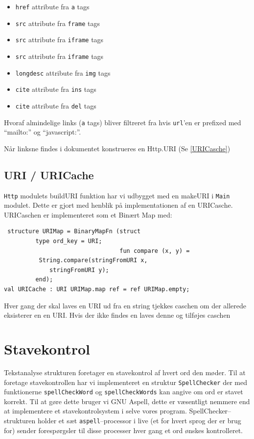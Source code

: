 \documentclass[a4paper,oneside,article]{memoir}
\begin{document}
\begin{itemize}
 \item \texttt{href} attribute fra \texttt{a} tags
 \item \texttt{src} attribute fra \texttt{frame} tags
 \item \texttt{src} attribute fra \texttt{iframe} tags
 \item \texttt{src} attribute fra \texttt{iframe} tags
 \item \texttt{longdesc} attribute fra \texttt{img} tags
 \item \texttt{cite} attribute fra \texttt{ins} tags
 \item \texttt{cite} attribute fra \texttt{del} tags
\end{itemize}

Hvoraf almindelige links (\texttt{a} tags) bliver filtreret fra hvis
\texttt{url}'en er prefixed med ``mailto:'' og ``javascript:''.

 Når linksne findes i dokumentet konstrueres en Http.URI (Se \ref{URICasche})

\subsection{URI / URICache}

\texttt{Http} modulets buildURI funktion har vi udbygget med en
makeURI i \texttt{Main} modulet. Dette er gjort med henblik på
implementationen af en URICasche. URICaschen er implementeret som et
Binært Map med:

\begin{lstlisting}
 structure URIMap = BinaryMapFn (struct 
         type ord_key = URI; 
                                 fun compare (x, y) = 
          String.compare(stringFromURI x, 
             stringFromURI y);
         end);
val URICache : URI URIMap.map ref = ref URIMap.empty;
\end{lstlisting}

Hver gang der skal laves en URI ud fra en string tjekkes caschen om
der allerede eksisterer en en URI. Hvis der ikke findes en laves denne
og tilføjes caschen

\section{Stavekontrol}
\label{Spellchecker}

Tekstanalyse strukturen foretager en stavekontrol af hvert ord den
møder. Til at foretage stavekontrollen har vi implementeret en
struktur \texttt{SpellChecker} der med funktionerne
\texttt{spellCheckWord} og \texttt{spellCheckWords} kan angive om ord
er stavet korrekt. Til at gøre dette bruger vi GNU Aspell, dette er
væsentligt nemmere end at implementere et stavekontrolsystem i selve
vores program. SpellChecker--strukturen holder et sæt
\texttt{aspell}--processor i live (et for hvert sprog der er brug for)
sender forespørgsler til disse processer hver gang et ord ønskes
kontrolleret.
\end{document}
